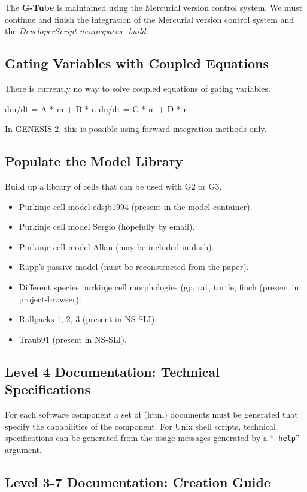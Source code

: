 \documentclass[12pt]{article}
\begin{document}
The {\bf G-Tube} is maintained using the Mercurial version control system.
We must continue and finish the integration of the Mercurial version
control system and the {\it DeveloperScript neurospaces\_build}.


\subsection{Gating Variables with Coupled Equations}

There is currently no way to solve coupled equations of gating
variables.

dm/dt = A * m + B * n
dn/dt = C * m + D * n

In GENESIS 2, this is possible using forward integration methods only.


\subsection{Populate the Model Library}

Build up a library of cells that can be used with G2 or G3.

\begin{itemize}
\item Purkinje cell model edsjb1994 (present in the model container).
\item Purkinje cell model Sergio (hopefully by email).
\item Purkinje cell model Allan (may be included in dash).
\item Rapp's passive model (must be reconstructed from the paper).
\item Different species purkinje cell morphologies (gp, rat, turtle,
  finch (present in project-browser).
\item Rallpacks 1, 2, 3 (present in NS-SLI).
\item Traub91 (present in NS-SLI).
\end{itemize}

\subsection{Level 4 Documentation: Technical Specifications}

For each software component a set of (html) documents must be
generated that specify the capabilities of the component.  For Unix
shell scripts, technical specifications can be generated from the
usage messages generated by a ``{\tt --help}'' argument.

\subsection{Level 3-7 Documentation: Creation Guide}
\end{document}
